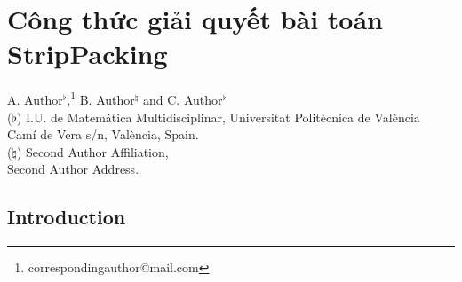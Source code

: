 \documentclass[a4paper,11pt]{book}
\begin{document}
\chapter{Công thức giải quyết bài toán StripPacking}

\thispagestyle{empty}
\vspace{-0.5cm}
\begin{center}
\begin{large}
		A. Author$^\flat$,\footnote{correspondingauthor@mail.com}
		B. Author$^\natural$
		and C. Author$^\flat$\\
		\vspace{0.25cm}
		\normalsize ($\flat$)\; I.U. de Matemática Multidisciplinar, Universitat Politècnica de València \\
        \normalsize Camí de Vera s/n, València, Spain.\\ 
        \vspace{0.1cm}
		\normalsize ($\natural$)\;  Second Author Affiliation,\\
        \normalsize Second Author Address.\\ 
\end{large}
\end{center}
\vspace{-0.5cm}

\section{Introduction}

\end{document}
